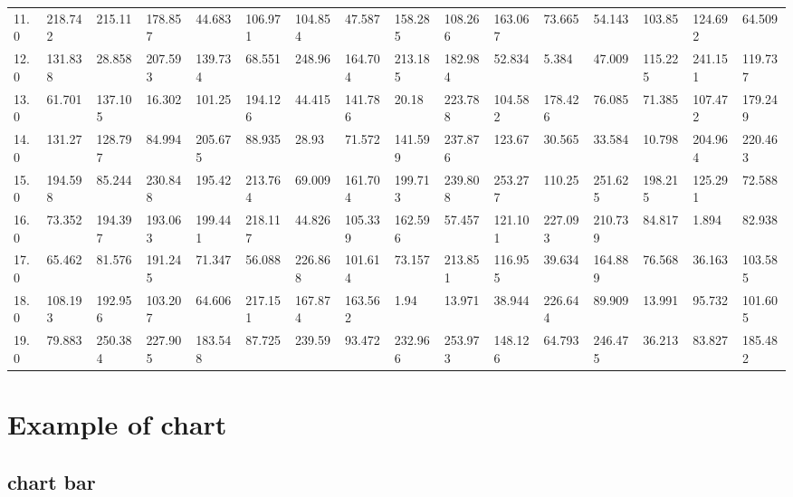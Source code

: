 \documentclass[reprint, floatfix, groupaddress, prb]{article}
\begin{document}
\begin{table}[ht]
{\begin{tabular}[l]{llllllllllllllll}
11.0 & 218.742 & 215.11 & 178.857 & 44.683 & 106.971 & 104.854 & 47.587 & 158.285 & 108.266 & 163.067 & 73.665 & 54.143 & 103.85 & 124.692 & 64.509\\ 
12.0 & 131.838 & 28.858 & 207.593 & 139.734 & 68.551 & 248.96 & 164.704 & 213.185 & 182.984 & 52.834 & 5.384 & 47.009 & 115.225 & 241.151 & 119.737\\ 
13.0 & 61.701 & 137.105 & 16.302 & 101.25 & 194.126 & 44.415 & 141.786 & 20.18 & 223.788 & 104.582 & 178.426 & 76.085 & 71.385 & 107.472 & 179.249\\ 
14.0 & 131.27 & 128.797 & 84.994 & 205.675 & 88.935 & 28.93 & 71.572 & 141.599 & 237.876 & 123.67 & 30.565 & 33.584 & 10.798 & 204.964 & 220.463\\ 
15.0 & 194.598 & 85.244 & 230.848 & 195.42 & 213.764 & 69.009 & 161.704 & 199.713 & 239.808 & 253.277 & 110.25 & 251.625 & 198.215 & 125.291 & 72.588\\ 
16.0 & 73.352 & 194.397 & 193.063 & 199.441 & 218.117 & 44.826 & 105.339 & 162.596 & 57.457 & 121.101 & 227.093 & 210.739 & 84.817 & 1.894 & 82.938\\ 
17.0 & 65.462 & 81.576 & 191.245 & 71.347 & 56.088 & 226.868 & 101.614 & 73.157 & 213.851 & 116.955 & 39.634 & 164.889 & 76.568 & 36.163 & 103.585\\ 
18.0 & 108.193 & 192.956 & 103.207 & 64.606 & 217.151 & 167.874 & 163.562 & 1.94 & 13.971 & 38.944 & 226.644 & 89.909 & 13.991 & 95.732 & 101.605\\ 
19.0 & 79.883 & 250.384 & 227.905 & 183.548 & 87.725 & 239.59 & 93.472 & 232.966 & 253.973 & 148.126 & 64.793 & 246.475 & 36.213 & 83.827 & 185.482\\ 
\bottomrule 
 \end{tabular}
}\end{table}

    
    

    \hypertarget{example-of-chart}{%
\section{Example of chart}\label{example-of-chart}}

    \hypertarget{chart-bar}{%
\subsection{chart bar}\label{chart-bar}}

        
    \begin{figure}
        \begin{center}\end{center}
        \caption{}
        \label{}
    \end{figure}
    
\end{document}
